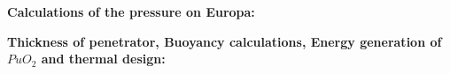\label{app:ricard}

\textbf{Calculations of the pressure on Europa:}


\newpage
\noindent
\textbf{Thickness of penetrator, Buoyancy calculations, Energy generation of $PuO_2$ and thermal design:}

